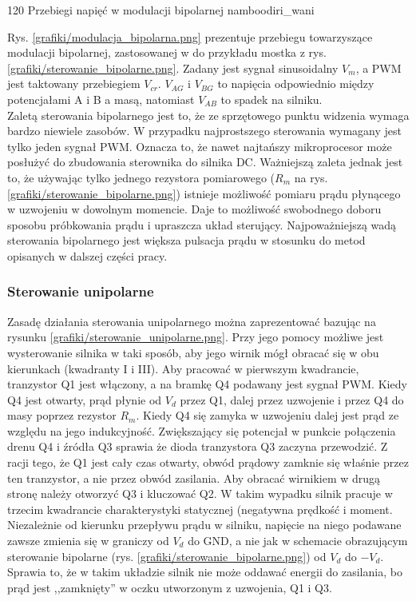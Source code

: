 	{120}
	{Przebiegi napięć w modulacji bipolarnej}
	{namboodiri_wani}
	
Rys. \ref{grafiki/modulacja_bipolarna.png} prezentuje przebiegu towarzyszące modulacji bipolarnej, zastosowanej w do przykładu mostka z rys. \ref{grafiki/sterowanie_bipolarne.png}. Zadany jest sygnał sinusoidalny $ V_m $, a PWM jest taktowany przebiegiem $ V_{cr} $. $ V_{AG} $ i $ V_{BG} $ to napięcia odpowiednio między potencjałami A i B a masą, natomiast $ V_{AB} $ to spadek na silniku. \\

Zaletą sterowania bipolarnego jest to, że ze sprzętowego punktu widzenia wymaga bardzo niewiele zasobów. W przypadku najprostszego sterowania wymagany jest tylko jeden sygnał PWM. Oznacza to, że nawet najtańszy mikroprocesor może posłużyć do zbudowania sterownika do silnika DC. Ważniejszą zaleta jednak jest to, że używając tylko jednego rezystora pomiarowego ($ R_m $ na rys. \ref{grafiki/sterowanie_bipolarne.png}) istnieje możliwość pomiaru prądu płynącego w uzwojeniu w dowolnym momencie. Daje to możliwość swobodnego doboru sposobu próbkowania prądu i upraszcza układ sterujący. Najpoważniejszą wadą sterowania bipolarnego jest większa pulsacja prądu w stosunku do metod opisanych w dalszej części pracy.

\subsubsection{Sterowanie unipolarne}
\label{sss:moduni}

Zasadę działania sterowania unipolarnego można zaprezentować bazując na rysunku \ref{grafiki/sterowanie_unipolarne.png}. Przy jego pomocy możliwe jest wysterowanie silnika w taki sposób, aby jego wirnik mógł obracać się w obu kierunkach (kwadranty I i III). Aby pracować w pierwszym kwadrancie, tranzystor Q1 jest włączony, a na bramkę Q4 podawany jest sygnał PWM. Kiedy Q4 jest otwarty, prąd płynie od $ V_d $ przez Q1, dalej przez uzwojenie i przez Q4 do masy poprzez rezystor $ R_m $. Kiedy Q4 się zamyka w uzwojeniu dalej jest prąd ze względu na jego indukcyjność. Zwiększający się potencjał w punkcie połączenia drenu Q4 i źródła Q3 sprawia że dioda tranzystora Q3 zaczyna przewodzić. Z racji tego, że Q1 jest cały czas otwarty, obwód prądowy zamknie się właśnie przez ten tranzystor, a nie przez obwód zasilania. Aby obracać wirnikiem w drugą stronę należy otworzyć Q3 i kluczować Q2. W takim wypadku silnik pracuje w trzecim kwadrancie charakterystyki statycznej (negatywna prędkość i moment. Niezależnie od kierunku przepływu prądu w silniku, napięcie na niego podawane zawsze zmienia się w graniczy od $ V_d $ do GND, a nie jak w schemacie obrazującym sterowanie bipolarne (rys. \ref{grafiki/sterowanie_bipolarne.png}) od $ V_d $ do $ -V_d $. Sprawia to, że w takim układzie silnik nie może oddawać energii do zasilania, bo prąd jest ,,zamknięty'' w oczku utworzonym z uzwojenia, Q1 i Q3. 

